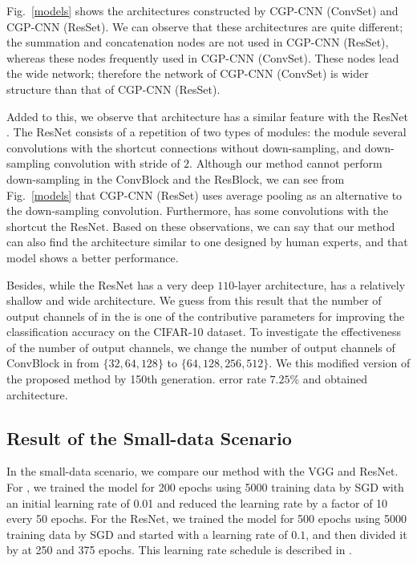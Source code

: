 Fig.~\ref{models} shows the architectures constructed by CGP-CNN (ConvSet) and CGP-CNN (ResSet). We can observe that these architectures are quite different; the summation and concatenation nodes are not used in CGP-CNN (ResSet), whereas these nodes  frequently used in CGP-CNN (ConvSet). These nodes lead the wide network; therefore\new{,} the network of CGP-CNN (ConvSet) is  wider structure than that of CGP-CNN (ResSet).

Added to this, we observe that  architecture has a similar feature with the ResNet \cite{he_deep_2016}. The ResNet consists of a repetition of two types of modules: the module  several convolutions with the shortcut connections without down-sampling, and down-sampling convolution with  stride of $2$.  Although our method cannot perform down-sampling in the ConvBlock and the ResBlock, we can see from Fig.~\ref{models} that CGP-CNN (ResSet) uses average pooling as an alternative to the down-sampling convolution. Furthermore,  has some convolutions with the shortcut   the ResNet. Based on these observations, we can say that our method can also find the architecture similar to one designed by human experts, and that model shows a better performance.

Besides, while the ResNet has a very deep $110$-layer architecture,  has a relatively shallow and wide architecture.
We guess from this result that the number of output channels of  in the  is one of the contributive parameters for improving the classification accuracy on the CIFAR-10 dataset. To investigate the effectiveness of the number of output channels, we change the number of output channels of ConvBlock in  from $\{32, 64, 128\}$ to $\{64, 128, 256, 512\}$. We  this modified version of the proposed method by  150th generation.   error rate  $7.25$\% and  obtained  architecture.


\subsection{Result of the Small-data Scenario}
In the small-data scenario, we compare our method with the VGG and ResNet.
For , we  trained the model for 200 epochs using 5000 training data by SGD with an initial learning rate of 0.01\new{,} and  reduced the learning rate by a factor of 10 every 50 epochs.
For the ResNet, we  trained the model for 500 epochs using 5000 training data by SGD and started with a learning rate of $0.1$, and then divided it by  at 250 and 375 epochs. This learning rate schedule is described in \cite{he_deep_2016}.

